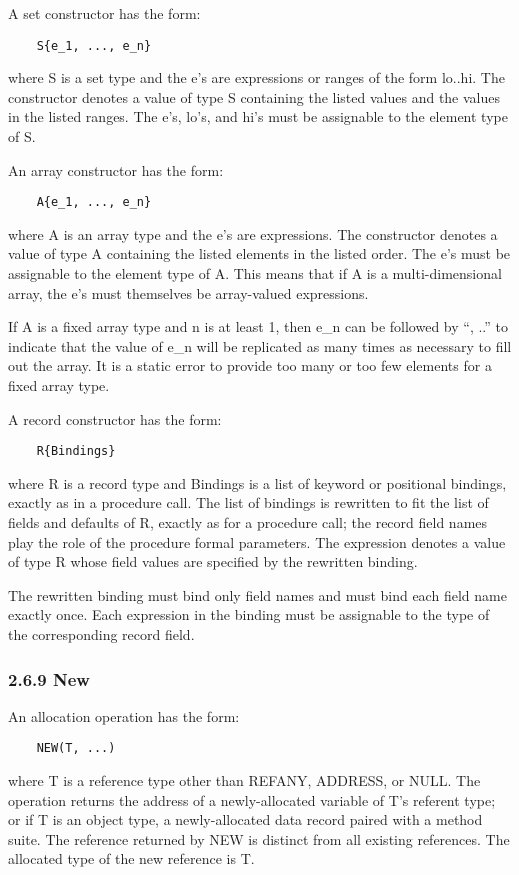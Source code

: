 \documentclass[10pt]{article}
\begin{document}
A set constructor has the form:
\begin{verbatim}
    S{e_1, ..., e_n}
\end{verbatim}
where S is a set type and the e's are expressions or ranges of the form
lo..hi.  The constructor denotes a value of type S containing the listed
values and the values in the listed ranges.  The e's, lo's, and hi's must be
assignable to the element type of S.

An array constructor has the form:
\begin{verbatim}
    A{e_1, ..., e_n}
\end{verbatim}
where A is an array type and the e's are expressions.  The constructor denotes
a value of type A containing the listed elements in the listed order.  The e's
must be assignable to the element type of A.  This means that if A is a
multi-dimensional array, the e's must themselves be array-valued expressions.

If A is a fixed array type and n is at least 1, then e\_n can be followed by
``, ..'' to indicate that the value of e\_n will be replicated as many times
as necessary to fill out the array.  It is a static error to provide too many
or too few elements for a fixed array type.

A record constructor has the form:
\begin{verbatim}
    R{Bindings}
\end{verbatim}
where R is a record type and Bindings is a list of keyword or positional
bindings, exactly as in a procedure call.  The list of bindings is rewritten
to fit the list of fields and defaults of R, exactly as for a procedure call;
the record field names play the role of the procedure formal parameters.  The
expression denotes a value of type R whose field values are specified by the
rewritten binding.

The rewritten binding must bind only field names and must bind each field name
exactly once.  Each expression in the binding must be assignable to the type
of the corresponding record field.

\subsubsection*{2.6.9 New}

An allocation operation has the form:
\begin{verbatim}
    NEW(T, ...)
\end{verbatim}
where T is a reference type other than REFANY, ADDRESS, or NULL.  The
operation returns the address of a newly-allocated variable of T's referent
type; or if T is an object type, a newly-allocated data record paired with a
method suite.  The reference returned by NEW is distinct from all existing
references.  The allocated type of the new reference is T.
\end{document}
